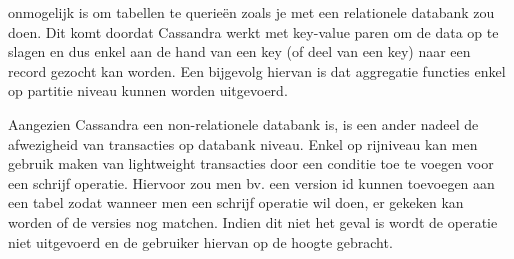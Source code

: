 \documentclass{article}
\begin{document}
	onmogelijk is om tabellen te querieën zoals je met een relationele databank zou doen. 
	Dit komt doordat Cassandra werkt met key-value paren om de data op te slagen en dus enkel aan de hand van een key 
	(of deel van een key) naar een record gezocht kan worden. 
	Een bijgevolg hiervan is dat aggregatie functies enkel op partitie niveau kunnen worden uitgevoerd.
	\par
	Aangezien Cassandra een non-relationele databank is, is een ander nadeel de afwezigheid van transacties op databank niveau.
	Enkel op rijniveau kan men gebruik maken van lightweight transacties door een conditie toe te voegen voor een schrijf operatie.
	Hiervoor zou men bv. een version id kunnen toevoegen aan een tabel zodat wanneer men een schrijf operatie wil doen,
	er gekeken kan worden of de versies nog matchen. 
	Indien dit niet het geval is wordt de operatie niet uitgevoerd en de gebruiker hiervan op de hoogte gebracht.
\end{document}
